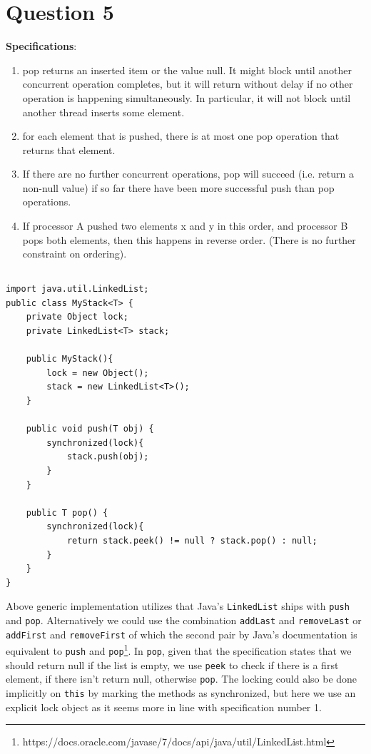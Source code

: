 \documentclass[a5paper]{article}
\begin{document}
\section{Question 5}
\textbf{Specifications}:
\begin{enumerate}
\item pop returns an inserted item or the value null. It might block until another concurrent operation completes,
but it will return without delay if no other operation is happening simultaneously. In particular, it will not
block until another thread inserts some element.
\item for each element that is pushed, there is at most one pop operation that returns that element.
\item If there are no further concurrent operations, pop will succeed (i.e. return a non-null value) if so far there
have been more successful push than pop operations.
\item If processor A pushed two elements x and y in this order, and processor B pops both elements, then this
happens in reverse order. (There is no further constraint on ordering).
\end{enumerate}

\subsection{}\label{sec:mystacksimple}
\begin{lstlisting}
import java.util.LinkedList;
public class MyStack<T> {
    private Object lock;
    private LinkedList<T> stack;

    public MyStack(){
        lock = new Object();
        stack = new LinkedList<T>();
    }

    public void push(T obj) {
        synchronized(lock){
            stack.push(obj);
        }
    }

    public T pop() {
        synchronized(lock){
            return stack.peek() != null ? stack.pop() : null;
        }
    }
}
\end{lstlisting}

Above generic implementation utilizes that Java's \texttt{LinkedList} ships with \texttt{push} and \texttt{pop}.
Alternatively we could use the combination \texttt{addLast} and \texttt{removeLast} or \texttt{addFirst} and \texttt{removeFirst} 
of which the second pair by Java's documentation is equivalent to \texttt{push} and \texttt{pop}\footnote{https://docs.oracle.com/javase/7/docs/api/java/util/LinkedList.html}. 
In \texttt{pop}, given that the specification states that we should return null if the list is empty, we use \texttt{peek} to check if there is a first element, if there isn't return null, otherwise \texttt{pop}.
The locking could also be done implicitly on \texttt{this} by marking the methods as synchronized, but here we use an explicit lock object as it seems more in line with specification number 1.
\end{document}
